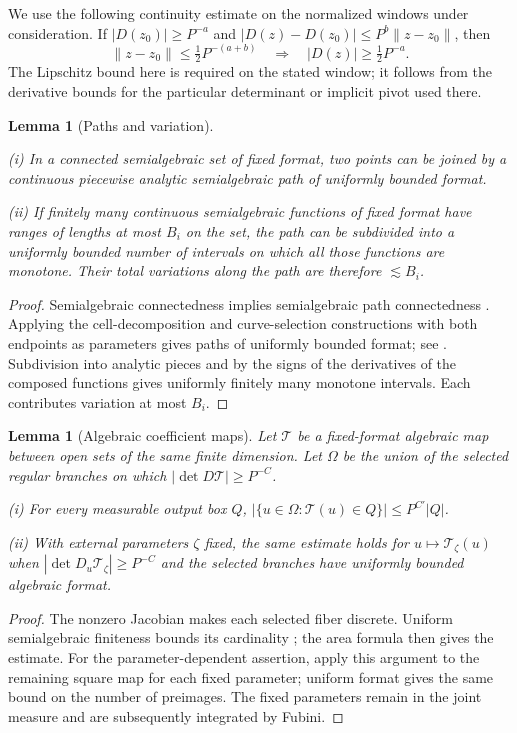 \documentclass[11pt]{amsart}
\newtheorem{lemma}[theorem]{Lemma}
\theoremstyle{definition}
\theoremstyle{remark}
\numberwithin{equation}{section}
\begin{document}
We use the following continuity estimate on the normalized windows under consideration. If $|D(z_0)|\ge P^{-a}$ and $|D(z)-D(z_0)|\le P^b\|z-z_0\|$, then
\[
\|z-z_0\|\le\tfrac12P^{-(a+b)}\quad\Longrightarrow\quad |D(z)|\ge\tfrac12P^{-a}.
\]
The Lipschitz bound here is required on the stated window; it follows from the derivative bounds for the particular determinant or implicit pivot used there.

\begin{lemma}[Paths and variation]\label{geo:paths}

\leavevmode\noindent\textup{(i)} In a connected semialgebraic set of fixed format, two points can be joined by a continuous piecewise analytic semialgebraic path of uniformly bounded format.

\noindent\textup{(ii)} If finitely many continuous semialgebraic functions of fixed format have ranges of lengths at most $B_i$ on the set, the path can be subdivided into a uniformly bounded number of intervals on which all those functions are monotone. Their total variations along the path are therefore $\lesssim B_i$.
\end{lemma}
\begin{proof}
Semialgebraic connectedness implies semialgebraic path connectedness \cite[Theorems 5.22--5.23]{BPR}. Applying the cell-decomposition and curve-selection constructions with both endpoints as parameters gives paths of uniformly bounded format; see \cite[Theorems 3.19, 5.6, and 14.16]{BPR}. Subdivision into analytic pieces and by the signs of the derivatives of the composed functions gives uniformly finitely many monotone intervals. Each contributes variation at most $B_i$.
\end{proof}

\begin{lemma}[Algebraic coefficient maps]\label{geo:coefficient-map}\label{low:4:sf:coefficient-map}\label{low:5:qsf:coefficient-map}\label{low:6:qsf:coefficient-map}
Let $\mathcal T$ be a fixed-format algebraic map between open sets of the same finite dimension. Let $\Omega$ be the union of the selected regular branches on which $|\det D\mathcal T|\ge P^{-C}$.

\noindent\textup{(i)} For every measurable output box $Q$, $|\{u\in\Omega:\mathcal T(u)\in Q\}|\le P^{C'}|Q|$.

\noindent\textup{(ii)} With external parameters $\zeta$ fixed, the same estimate holds for $u\mapsto\mathcal T_\zeta(u)$ when $|\det D_u\mathcal T_\zeta|\ge P^{-C}$ and the selected branches have uniformly bounded algebraic format.
\end{lemma}
\begin{proof}
The nonzero Jacobian makes each selected fiber discrete. Uniform semialgebraic finiteness bounds its cardinality \cite[Theorem 5.46]{BPR}; the area formula \cite[Theorem 1]{low:area} then gives the estimate. For the parameter-dependent assertion, apply this argument to the remaining square map for each fixed parameter; uniform format gives the same bound on the number of preimages. The fixed parameters remain in the joint measure and are subsequently integrated by Fubini.
\end{proof}
\end{document}
